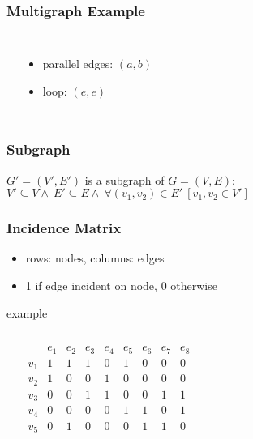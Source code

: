 \documentclass[dvipsnames]{beamer}
\begin{document}
\begin{frame}
  \frametitle{Multigraph Example}

  \begin{columns}
    \begin{center}
    \end{center}

    \begin{itemize}
      \item parallel edges: $(a,b)$
      \item loop: $(e,e)$
    \end{itemize}
  \end{columns}
\end{frame}

\begin{frame}
  \frametitle{Subgraph}

  \begin{definition}
    $G'=(V',E')$ is a \alert{subgraph} of $G=(V,E)$:\\
      $V' \subseteq V \wedge~ E' \subseteq E \wedge~
      \forall (v_1,v_2) \in E'~[v_1,v_2 \in V']$
  \end{definition}
\end{frame}

\begin{frame}
  \frametitle{Incidence Matrix}

  \begin{itemize}
    \item rows: nodes, columns: edges
    \item 1 if edge incident on node, 0 otherwise
  \end{itemize}

  \begin{exampleblock}{example}
    \begin{columns}
      \begin{center}
      \end{center}

      \[
        \begin{array}{c|cccccccc}
              & e_1 & e_2 & e_3 & e_4 & e_5 & e_6 & e_7 & e_8\\\hline
          v_1 & 1 & 1 & 1 & 0 & 1 & 0 & 0 & 0\\
          v_2 & 1 & 0 & 0 & 1 & 0 & 0 & 0 & 0\\
          v_3 & 0 & 0 & 1 & 1 & 0 & 0 & 1 & 1\\
          v_4 & 0 & 0 & 0 & 0 & 1 & 1 & 0 & 1\\
          v_5 & 0 & 1 & 0 & 0 & 0 & 1 & 1 & 0
        \end{array}
      \]
    \end{columns}
  \end{exampleblock}
\end{frame}
\end{document}
